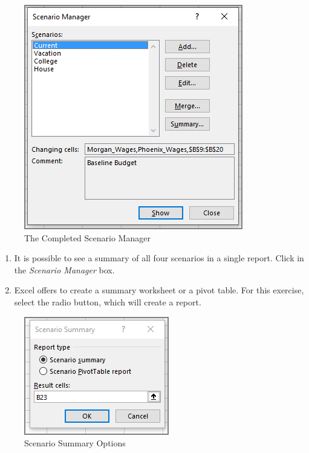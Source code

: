 \begin{figure}[H]
	\centering
	\includegraphics[width=\maxwidth{.75\linewidth}]{gfx/ch08_fig57}
	\caption{The Completed Scenario Manager}
	\label{08:fig57}
\end{figure}

\begin{enumerate}[resume]	
	
	\item It is possible to see a summary of all four scenarios in a single report. Click  in the \textit{Scenario Manager} box.
	\item Excel offers to create a summary worksheet or a pivot table. For this exercise, select the  radio button, which will create a report.
	
\end{enumerate}

\begin{figure}[H]
	\centering
	\includegraphics[width=\maxwidth{.55\linewidth}]{gfx/ch08_fig58}
	\caption{Scenario Summary Options}
	\label{08:fig58}
\end{figure}

